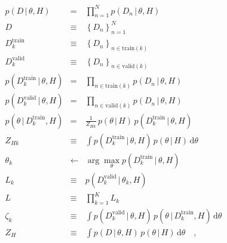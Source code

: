 \documentclass[12pt]{article}
\newcommand{\given}{\,|\,}
\newcommand{\setof}[1]{\left\{{#1}\right\}}
\newcommand{\train}{\mathrm{train}}
\newcommand{\valid}{\mathrm{valid}}
\newcommand{\dd}{\mathrm{d}}
\begin{document}
\begin{eqnarray}
p(D\given\theta,H) &=& \prod_{n=1}^N p(D_n\given\theta,H)
\\
D &\equiv& \setof{D_n}_{n=1}^N
\\
D^\train_k &\equiv& \setof{D_n}_{n\in\train(k)}
\\
D^\valid_k &\equiv& \setof{D_n}_{n\in\valid(k)}
\\
p(D^\train_k\given\theta,H) &=& \prod_{n\in\train(k)} p(D_n\given\theta,H)
\\
p(D^\valid_k\given\theta,H) &=& \prod_{n\in\valid(k)} p(D_n\given\theta,H)
\\
p(\theta\given D^\train_k,H) &=& \frac{1}{Z_{Hk}}\,p(\theta\given H)\,p(D^\train_k\given\theta,H)
\\
Z_{Hk} &\equiv& \int p(D^\train_k\given\theta,H)\,p(\theta\given H)\,\dd\theta
\\
\theta_k &\leftarrow& \arg\max_\theta p(D^\train_k\given\theta,H)
\\
L_k &\equiv& p(D^\valid_k\given\theta_k,H)
\\
L &\equiv& \prod_{k=1}^K L_k
\\
\zeta_k &\equiv& \int p(D^\valid_k\given\theta,H)\,p(\theta\given D^\train_k,H)\,\dd\theta
\\
Z_H &\equiv& \int p(D\given\theta,H)\,p(\theta\given H)\,\dd\theta
\quad,
\end{eqnarray}
\end{document}
